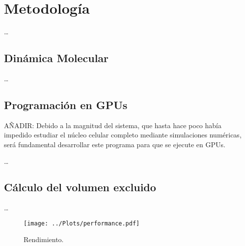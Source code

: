 \chapter{Metodología}
\label{cap:methodology}

\dots

\section{Dinámica Molecular}

\dots

\section{Programación en GPUs}

AÑADIR: Debido a la magnitud del sistema, que hasta hace poco había impedido estudiar el núcleo celular completo mediante simulaciones numéricas, será fundamental desarrollar este programa para que se ejecute en GPUs.

\cite{Wilt2013}

\dots

\section{Cálculo del volumen excluido}

\dots

\begin{figure}
  \centering
  \texttt{[image: ../Plots/performance.pdf]}
  \caption{Rendimiento.}
  \label{fig:performance}
\end{figure}
